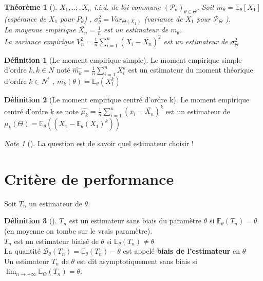 \documentclass{article}
\theoremstyle{plain}%
\newtheorem{thm}{Théorème}[section]
\theoremstyle{definition}
\newtheorem{defn}{Définition}[section]
\theoremstyle{remark}
\newtheorem*{note}{Note}
\begin{document}
\begin{thm}[]
    $ X_1, ..;, X_n $ i.i.d. de loi commune $ (\mathcal{P}_{\theta })_{\theta \in \Theta} $. Soit $ m_{\theta } = \mathbb{E}_{\theta }[X_1] $ (espérance de $ X_1 $ pour $ P_{\theta } $)  , $ \sigma ^2_{\theta } = Var_{\Theta (X_1)} $ (variance de $ X_1 $ pour $ \mathcal{P}_{\Theta } $ ). \\
    La moyenne empirique $ \bar{X_n} = \frac{1}{n} $ est un estimateur de $ m_{\theta } $. \\
    La variance empirique $ V_n^2 = \frac{1}{n}\sum_{i=1}^{n}(X_i - \bar{X_n})^2  $ est un estimateur de $ \sigma _{\Theta }^2 $   
\end{thm}

\begin{defn}[Le moment empirique simple]
    Le moment empirique simple d'ordre $ k, k \in N $ noté $ \hat{m_k} = \frac{1}{n}\sum_{i=1}^{n}X_i^k $ est un estimateur du moment théorique d'ordre $ k \in N^* $ , $ m_k(\theta) = \mathbb{E}_{\theta } (X_1^k) $  
\end{defn}

\begin{defn}[Le moment empirique centré d'ordre k]
    Le moment empirique centré d'ordre k se note $ \hat{\mu _k}= \frac{1}{n}\sum_{i=1}^{n}(x_i - \bar{X_n})^k $ est un estimateur de $ \mu _k (\Theta ) = \mathbb{E}_{\theta } ((X_1-\mathbb{E}_{\theta }(X_1)^k)) $  
\end{defn}

\begin{note}[]
    La question est de savoir quel estimateur choisir ! 
\end{note}

\section{Critère de performance}
Soit $ T_n $ un estimateur de $ \theta  $. 
\begin{defn}[]
    $ T_n $ est un estimateur sans biais du paramètre $ \theta  $ si $ \mathbb{E}_{\theta } (T_n) = \theta $ (en moyenne on tombe sur le vrais paramètre). \\
    $ T_n $ est un estimateur biaisé de $ \theta  $ si $ \mathbb{E}_{\theta } (T_n) \neq  \theta $ \\
    La quantité $ \mathcal{B}_\theta (T_n) = \mathbb{E}_\theta (T_n) - \theta  $ est appelé \textbf{biais de l'estimateur} en $ \theta  $ \\
    Un estimateur $ T_n $ de $ \theta  $ est dit asymptotiquement sans biais si $ \lim_{n \to +\infty} \mathbb{E}_\Theta (T_n) = \theta $.
\end{defn}
\end{document}
